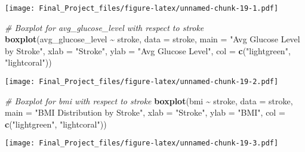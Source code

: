 \documentclass[
]{article}
\newenvironment{Shaded}{\begin{snugshade}}{\end{snugshade}}
\newcommand{\AttributeTok}[1]{\textcolor[rgb]{0.13,0.29,0.53}{#1}}
\newcommand{\CommentTok}[1]{\textcolor[rgb]{0.56,0.35,0.01}{\textit{#1}}}
\newcommand{\FunctionTok}[1]{\textcolor[rgb]{0.13,0.29,0.53}{\textbf{#1}}}
\newcommand{\NormalTok}[1]{#1}
\newcommand{\SpecialCharTok}[1]{\textcolor[rgb]{0.81,0.36,0.00}{\textbf{#1}}}
\newcommand{\StringTok}[1]{\textcolor[rgb]{0.31,0.60,0.02}{#1}}
\begin{document}
\texttt{[image: Final\_Project\_files/figure-latex/unnamed-chunk-19-1.pdf]}

\begin{Shaded}
\begin{Highlighting}[]
\CommentTok{\# Boxplot for avg\_glucose\_level with respect to stroke}
\FunctionTok{boxplot}\NormalTok{(avg\_glucose\_level }\SpecialCharTok{\textasciitilde{}}\NormalTok{ stroke, }\AttributeTok{data =}\NormalTok{ stroke, }\AttributeTok{main =} \StringTok{"Avg Glucose Level by Stroke"}\NormalTok{, }\AttributeTok{xlab =} \StringTok{"Stroke"}\NormalTok{, }\AttributeTok{ylab =} \StringTok{"Avg Glucose Level"}\NormalTok{, }\AttributeTok{col =} \FunctionTok{c}\NormalTok{(}\StringTok{"lightgreen"}\NormalTok{, }\StringTok{"lightcoral"}\NormalTok{))}
\end{Highlighting}
\end{Shaded}

\texttt{[image: Final\_Project\_files/figure-latex/unnamed-chunk-19-2.pdf]}

\begin{Shaded}
\begin{Highlighting}[]
\CommentTok{\# Boxplot for bmi with respect to stroke}
\FunctionTok{boxplot}\NormalTok{(bmi }\SpecialCharTok{\textasciitilde{}}\NormalTok{ stroke, }\AttributeTok{data =}\NormalTok{ stroke, }\AttributeTok{main =} \StringTok{"BMI Distribution by Stroke"}\NormalTok{, }\AttributeTok{xlab =} \StringTok{"Stroke"}\NormalTok{, }\AttributeTok{ylab =} \StringTok{"BMI"}\NormalTok{, }\AttributeTok{col =} \FunctionTok{c}\NormalTok{(}\StringTok{"lightgreen"}\NormalTok{, }\StringTok{"lightcoral"}\NormalTok{))}
\end{Highlighting}
\end{Shaded}

\texttt{[image: Final\_Project\_files/figure-latex/unnamed-chunk-19-3.pdf]}
\end{document}
